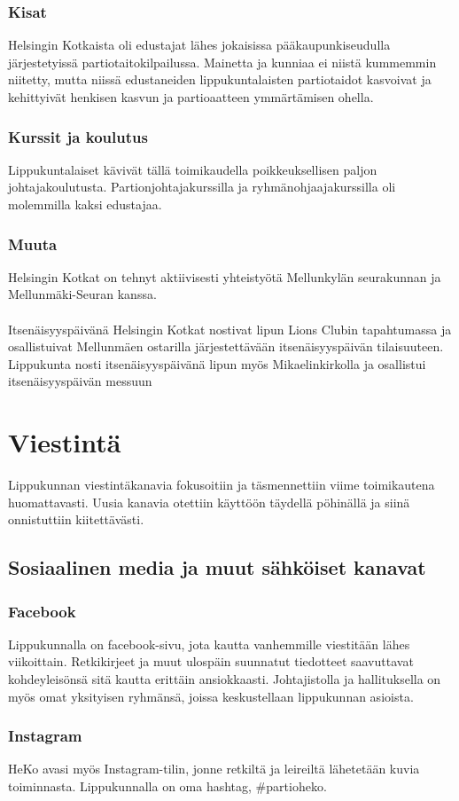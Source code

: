 \documentclass[a4paper, 12pt, finnish]{report} %
\begin{document}
\subsubsection{Kisat}
Helsingin Kotkaista oli edustajat lähes jokaisissa pääkaupunkiseudulla järjestetyissä partiotaitokilpailussa. Mainetta ja kunniaa ei niistä kummemmin niitetty, mutta niissä edustaneiden lippukuntalaisten partiotaidot kasvoivat ja kehittyivät henkisen kasvun ja partioaatteen ymmärtämisen ohella.
\subsubsection{Kurssit ja koulutus}
Lippukuntalaiset kävivät tällä toimikaudella poikkeuksellisen paljon johtajakoulutusta. Partionjohtajakurssilla ja ryhmänohjaajakurssilla oli molemmilla kaksi edustajaa.
\subsubsection{Muuta}
Helsingin Kotkat on tehnyt aktiivisesti yhteistyötä Mellunkylän seurakunnan ja Mellunmäki-Seuran kanssa.\\ 
\\Itsenäisyyspäivänä Helsingin Kotkat nostivat lipun Lions Clubin tapahtumassa ja osallistuivat Mellunmäen ostarilla järjestettävään itsenäisyyspäivän tilaisuuteen. Lippukunta nosti itsenäisyyspäivänä lipun myös Mikaelinkirkolla ja osallistui itsenäisyyspäivän messuun
\newpage
\section{Viestintä}
Lippukunnan viestintäkanavia fokusoitiin ja täsmennettiin viime toimikautena huomattavasti. Uusia kanavia otettiin käyttöön täydellä pöhinällä ja siinä onnistuttiin kiitettävästi.
\subsection{Sosiaalinen media ja muut sähköiset kanavat}
\subsubsection{Facebook}
Lippukunnalla on facebook-sivu, jota kautta vanhemmille viestitään lähes viikoittain. Retkikirjeet ja muut ulospäin suunnatut tiedotteet saavuttavat kohdeyleisönsä sitä kautta erittäin ansiokkaasti. Johtajistolla ja hallituksella on myös omat yksityisen ryhmänsä, joissa keskustellaan lippukunnan asioista.
\subsubsection{Instagram}
HeKo avasi myös Instagram-tilin, jonne retkiltä ja leireiltä lähetetään kuvia toiminnasta. Lippukunnalla on oma hashtag, \#partioheko.
\end{document}
